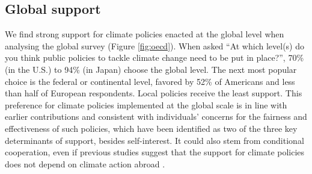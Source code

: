 \begin{bibunit}


\subsection{Global support}\label{subsubsec:global_support}

We find strong support for climate policies enacted at the global level when analysing the global survey (Figure \ref{fig:oecd}). %
When asked ``At which level(s) do you think public policies to tackle climate change need to be put in place?'', 70\% (in the U.S.) to 94\% (in Japan) choose the global level. The next most popular choice is the federal or continental level, favored by 52\% of Americans and less than half of European respondents. Local policies receive the least support. This preference for climate policies implemented at the global scale is in line with earlier contributions \cite{beiser-mcgrath_could_2019,bechtel_mass_2013,sivonen_attitudes_2022} %
and consistent with individuals' concerns for the fairness and effectiveness of such policies, which have been identified as two of the three key determinants of support, besides self-interest.\citep{klenert_making_2018,douenne_yellow_2022,dechezlepretre_fighting_nodate} It could also stem from conditional cooperation,\citep{barrett_self-enforcing_1994} even if previous studies suggest that the support for climate policies does not depend on climate action abroad \citep{aklin_prisoners_2020,tingley_conditional_2014}. %



\end{bibunit}
